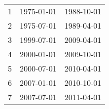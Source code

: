 % 
\begin{tabular}{ccc}
  \hline
  \hline
1 & 1975-01-01 & 1988-10-01 \\ 
  2 & 1975-07-01 & 1989-04-01 \\ 
  3 & 1999-07-01 & 2009-04-01 \\ 
  4 & 2000-01-01 & 2009-10-01 \\ 
  5 & 2000-07-01 & 2010-04-01 \\ 
  6 & 2007-01-01 & 2010-10-01 \\ 
  7 & 2007-07-01 & 2011-04-01 \\ 
   \hline
\end{tabular}
